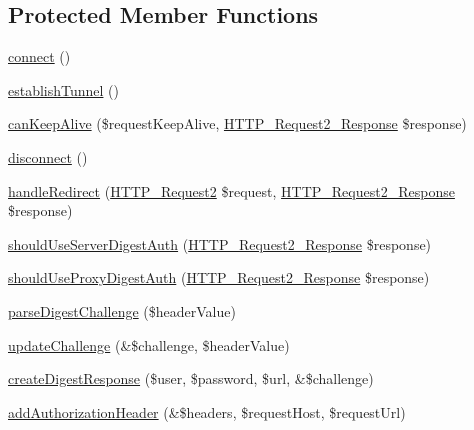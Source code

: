 \subsection*{Protected Member Functions}
\begin{DoxyCompactItemize}
\item 
\hyperlink{classHTTP__Request2__Adapter__Socket_a84b2a17c74b0dc0eb8ac7403adbeffc9}{connect} ()
\item 
\hyperlink{classHTTP__Request2__Adapter__Socket_a924bbeb198c174580c109eb563079296}{establish\+Tunnel} ()
\item 
\hyperlink{classHTTP__Request2__Adapter__Socket_a5171c1e7af2244777b09a8078ed5c667}{can\+Keep\+Alive} (\$request\+Keep\+Alive, \hyperlink{classHTTP__Request2__Response}{H\+T\+T\+P\+\_\+\+Request2\+\_\+\+Response} \$response)
\item 
\hyperlink{classHTTP__Request2__Adapter__Socket_a20cf7acb1fb9f0f80929ec368fc4ff8f}{disconnect} ()
\item 
\hyperlink{classHTTP__Request2__Adapter__Socket_aa60407169d7f2faee49d32a6d48d1f3e}{handle\+Redirect} (\hyperlink{classHTTP__Request2}{H\+T\+T\+P\+\_\+\+Request2} \$request, \hyperlink{classHTTP__Request2__Response}{H\+T\+T\+P\+\_\+\+Request2\+\_\+\+Response} \$response)
\item 
\hyperlink{classHTTP__Request2__Adapter__Socket_a3d9def9a7ef3725d00b81fa224eedeb3}{should\+Use\+Server\+Digest\+Auth} (\hyperlink{classHTTP__Request2__Response}{H\+T\+T\+P\+\_\+\+Request2\+\_\+\+Response} \$response)
\item 
\hyperlink{classHTTP__Request2__Adapter__Socket_af26e1fe3de20a109ff76fbadab10ec28}{should\+Use\+Proxy\+Digest\+Auth} (\hyperlink{classHTTP__Request2__Response}{H\+T\+T\+P\+\_\+\+Request2\+\_\+\+Response} \$response)
\item 
\hyperlink{classHTTP__Request2__Adapter__Socket_a271d3c7e7ce64e2acc6f560187c8a7cb}{parse\+Digest\+Challenge} (\$header\+Value)
\item 
\hyperlink{classHTTP__Request2__Adapter__Socket_abe6b620d64a56d799cd9367aedf3c0e6}{update\+Challenge} (\&\$challenge, \$header\+Value)
\item 
\hyperlink{classHTTP__Request2__Adapter__Socket_a8eeccb83fca751fd43b3035e31243940}{create\+Digest\+Response} (\$user, \$password, \$url, \&\$challenge)
\item 
\hyperlink{classHTTP__Request2__Adapter__Socket_af09e76396d487dae2bfc85b789c8f73b}{add\+Authorization\+Header} (\&\$headers, \$request\+Host, \$request\+Url)
\item 

\end{DoxyCompactItemize}
